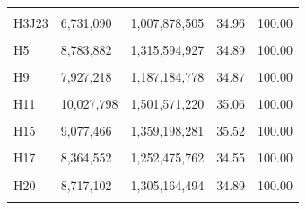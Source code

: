 \documentclass[
  a4paper,
  titlepage]{article}
\begin{document}
\begin{longtable}[t]{lllll}
\cellcolor{gray!6}{H3J22} & \cellcolor{gray!6}{9,075,498} & \cellcolor{gray!6}{1,359,104,642} & \cellcolor{gray!6}{35.26} & \cellcolor{gray!6}{100.00}\\
 
H3J23 & 6,731,090 & 1,007,878,505 & 34.96 & 100.00\\
 
\cellcolor{gray!6}{H4} & \cellcolor{gray!6}{9,515,152} & \cellcolor{gray!6}{1,425,017,606} & \cellcolor{gray!6}{35.23} & \cellcolor{gray!6}{100.00}\\
 
H5 & 8,783,882 & 1,315,594,927 & 34.89 & 100.00\\
 
\cellcolor{gray!6}{H8} & \cellcolor{gray!6}{7,871,818} & \cellcolor{gray!6}{1,179,088,243} & \cellcolor{gray!6}{34.81} & \cellcolor{gray!6}{100.00}\\
 
H9 & 7,927,218 & 1,187,184,778 & 34.87 & 100.00\\
 
\cellcolor{gray!6}{H10} & \cellcolor{gray!6}{10,371,526} & \cellcolor{gray!6}{1,553,541,189} & \cellcolor{gray!6}{34.55} & \cellcolor{gray!6}{100.00}\\
 
H11 & 10,027,798 & 1,501,571,220 & 35.06 & 100.00\\
 
\cellcolor{gray!6}{H13} & \cellcolor{gray!6}{10,203,598} & \cellcolor{gray!6}{1,528,513,658} & \cellcolor{gray!6}{34.75} & \cellcolor{gray!6}{100.00}\\
 
H15 & 9,077,466 & 1,359,198,281 & 35.52 & 100.00\\
 
\cellcolor{gray!6}{H16} & \cellcolor{gray!6}{10,074,934} & \cellcolor{gray!6}{1,508,644,424} & \cellcolor{gray!6}{34.71} & \cellcolor{gray!6}{100.00}\\
 
H17 & 8,364,552 & 1,252,475,762 & 34.55 & 100.00\\
 
\cellcolor{gray!6}{H18} & \cellcolor{gray!6}{10,597,118} & \cellcolor{gray!6}{1,586,685,911} & \cellcolor{gray!6}{34.40} & \cellcolor{gray!6}{100.00}\\
 
H20 & 8,717,102 & 1,305,164,494 & 34.89 & 100.00\\
 
\cellcolor{gray!6}{H21} & \cellcolor{gray!6}{8,768,526} & \cellcolor{gray!6}{1,313,089,189} & \cellcolor{gray!6}{34.87} & \cellcolor{gray!6}{100.00}\\
 

\end{longtable}
\end{document}
